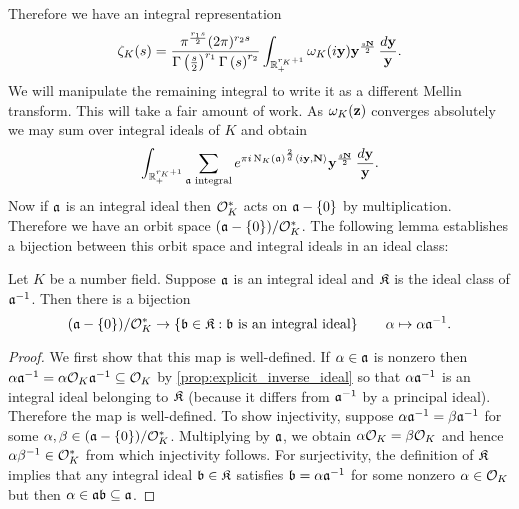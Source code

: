       Therefore we have an integral representation
      \[
        \zeta_{K}(s) = \frac{\pi^{\frac{r_{1}s}{2}}(2\pi)^{r_{2}s}}{\Gamma\left(\frac{s}{2}\right)^{r_{1}}\Gamma\left(s\right)^{r_{2}}}\int_{\mathbb{R}_{+}^{r_{K}+1}}\omega_{K}(i\mathbf{y})\mathbf{y}^{\frac{s\mathbf{N}}{2}}\,\frac{d\mathbf{y}}{\mathbf{y}}.
      \]
      We will manipulate the remaining integral to write it as a different Mellin transform. This will take a fair amount of work. As $\omega_{K}(\mathbf{z})$ converges absolutely we may sum over integral ideals of $K$ and obtain
      \[
        \int_{\mathbb{R}_{+}^{r_{K}+1}}\sum_{\text{$\mathfrak{a}$ integral}}e^{\pi i\operatorname{\mathrm{N}}_{K}(\mathfrak{a})^{\frac{2}{d}}\langle i\mathbf{y},\mathbf{N}\rangle}\mathbf{y}^{\frac{s\mathbf{N}}{2}}\,\frac{d\mathbf{y}}{\mathbf{y}}.
      \]
      Now if $\mathfrak{a}$ is an integral ideal then $\mathcal{O}_{K}^{\ast}$ acts on $\mathfrak{a}-\{0\}$ by multiplication. Therefore we have an orbit space $(\mathfrak{a}-\{0\})/\mathcal{O}_{K}^{\ast}$. The following lemma establishes a bijection between this orbit space and integral ideals in an ideal class:

      \begin{lemma}\label{lem:Hecke_theta_function_lemma}
        Let $K$ be a number field. Suppose $\mathfrak{a}$ is an integral ideal and $\mathfrak{K}$ is the ideal class of $\mathfrak{a}^{-1}$. Then there is a bijection
        \[
          (\mathfrak{a}-\{0\})/\mathcal{O}_{K}^{\ast} \to \{\mathfrak{b} \in \mathfrak{K}:\text{$\mathfrak{b}$ is an integral ideal}\} \qquad \alpha \mapsto \alpha\mathfrak{a}^{-1}.
        \]
      \end{lemma}
      \begin{proof}
        We first show that this map is well-defined. If $\alpha \in \mathfrak{a}$ is nonzero then $\alpha\mathfrak{a}^{-1} = \alpha\mathcal{O}_{K}\mathfrak{a}^{-1} \subseteq \mathcal{O}_{K}$ by \cref{prop:explicit_inverse_ideal} so that $\alpha\mathfrak{a}^{-1}$ is an integral ideal belonging to $\mathfrak{K}$ (because it differs from $\mathfrak{a}^{-1}$ by a principal ideal). Therefore the map is well-defined. To show injectivity, suppose $\alpha\mathfrak{a}^{-1} = \beta\mathfrak{a}^{-1}$ for some $\alpha,\beta \in (\mathfrak{a}-\{0\})/\mathcal{O}_{K}^{\ast}$. Multiplying by $\mathfrak{a}$, we obtain $\alpha\mathcal{O}_{K} = \beta\mathcal{O}_{K}$ and hence $\alpha\beta^{-1} \in \mathcal{O}_{K}^{\ast}$ from which injectivity follows. For surjectivity, the definition of $\mathfrak{K}$ implies that any integral ideal $\mathfrak{b} \in \mathfrak{K}$ satisfies $\mathfrak{b} = \alpha\mathfrak{a}^{-1}$ for some nonzero $\alpha \in \mathcal{O}_{K}$ but then $\alpha \in \mathfrak{a}\mathfrak{b} \subseteq \mathfrak{a}$.
      \end{proof}

